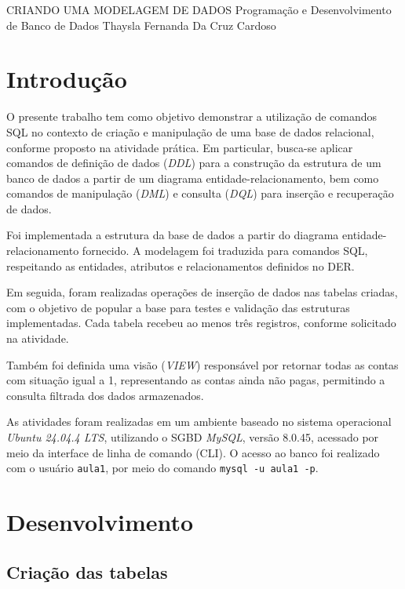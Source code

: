 \documentclass[12pt,a4paper]{article}
\begin{document}
\montarinicio
    {CRIANDO UMA MODELAGEM DE DADOS}
    {Programação e Desenvolvimento de Banco de Dados}
    {Thaysla Fernanda Da Cruz Cardoso}

\section{Introdução}

O presente trabalho tem como objetivo demonstrar a utilização de comandos SQL no contexto de criação e manipulação de uma base de dados relacional, conforme proposto na atividade prática. Em particular, busca-se aplicar comandos de definição de dados (\textit{DDL}) para a construção da estrutura de um banco de dados a partir de um diagrama entidade-relacionamento, bem como comandos de manipulação (\textit{DML}) e consulta (\textit{DQL}) para inserção e recuperação de dados.

Foi implementada a estrutura da base de dados a partir do diagrama entidade-relacionamento fornecido. A modelagem foi traduzida para comandos SQL, respeitando as entidades, atributos e relacionamentos definidos no DER.

Em seguida, foram realizadas operações de inserção de dados nas tabelas criadas, com o objetivo de popular a base para testes e validação das estruturas implementadas. Cada tabela recebeu ao menos três registros, conforme solicitado na atividade.

Também foi definida uma visão (\textit{VIEW}) responsável por retornar todas as contas com situação igual a 1, representando as contas ainda não pagas, permitindo a consulta filtrada dos dados armazenados.

As atividades foram realizadas em um ambiente baseado no sistema operacional \textit{Ubuntu 24.04.4 LTS}, utilizando o SGBD \textit{MySQL}, versão 8.0.45, acessado por meio da interface de linha de comando (CLI). O acesso ao banco foi realizado com o usuário \texttt{aula1}, por meio do comando \texttt{mysql -u aula1 -p}.

\section{Desenvolvimento}

\subsection{Criação das tabelas}
\end{document}
